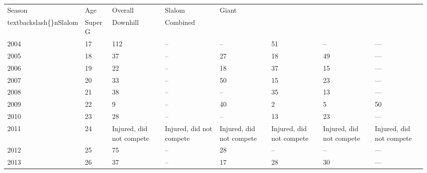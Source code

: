 \documentclass{article}
\begin{document}
\begin{tabular}{llllllll}
\toprule
Season & Age & Overall & Slalom & Giant\\textbackslash\{\}nSlalom & Super G & Downhill & Combined \\
\midrule
2004 & 17 & 112 & – & – & 51 & – & — \\
2005 & 18 & 37 & – & 27 & 18 & 49 & — \\
2006 & 19 & 22 & – & 18 & 37 & 15 & — \\
2007 & 20 & 33 & – & 50 & 15 & 23 & — \\
2008 & 21 & 38 & – & – & 35 & 13 & — \\
2009 & 22 & 9 & – & 40 & 2 & 5 & 50 \\
2010 & 23 & 28 & – & – & 13 & 23 & — \\
2011 & 24 & Injured, did not compete & Injured, did not compete & Injured, did not compete & Injured, did not compete & Injured, did not compete & Injured, did not compete \\
2012 & 25 & 75 & – & 28 & – & – & — \\
2013 & 26 & 37 & – & 17 & 28 & 30 & — \\
\bottomrule
\end{tabular}
\end{document}
